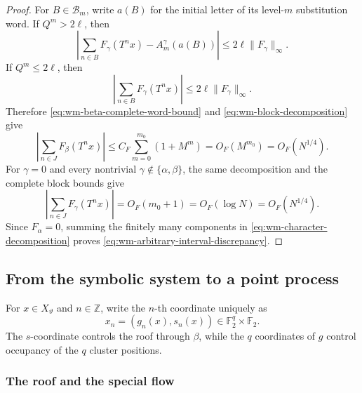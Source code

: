 \documentclass[11pt,reqno,a4paper]{amsart}
\numberwithin{equation}{section}
\theoremstyle{compact}
\theoremstyle{definition}
\theoremstyle{definition}
\begin{document}
\begin{proof}
For $B\in\mathcal B_m$, write $a(B)$ for the initial letter of its
level-$m$ substitution word.  If $Q^m>2\ell$, then
\begin{equation}\label{eq:wm-complete-block-vs-interior}
  \left|
    \sum_{n\in B}F_\gamma(T^nx)-A_m^\gamma(a(B))
  \right|
  \leq2\ell\|F_\gamma\|_\infty.
\end{equation}
If $Q^m\leq2\ell$, then
\[
  \left|\sum_{n\in B}F_\gamma(T^nx)\right|
  \leq2\ell\|F_\gamma\|_\infty.
\]
Therefore \eqref{eq:wm-beta-complete-word-bound} and
\eqref{eq:wm-block-decomposition} give
\begin{equation}\label{eq:wm-geometric-discrepancy-sum}
  \left|\sum_{n\in J}F_\beta(T^nx)\right|
  \leq C_F\sum_{m=0}^{m_0}(1+M^m)
  =O_F(M^{m_0})
  =O_F(N^{1/4}).
\end{equation}
For $\gamma=0$ and every nontrivial
$\gamma\notin\{\alpha,\beta\}$, the same decomposition and the complete
block bounds give
\[
  \left|\sum_{n\in J}F_\gamma(T^nx)\right|
  =O_F(m_0+1)=O_F(\log N)=O_F(N^{1/4}).
\]
Since $F_\alpha=0$, summing the finitely many components in
\eqref{eq:wm-character-decomposition} proves
\eqref{eq:wm-arbitrary-interval-discrepancy}.
\end{proof}


\subsection{From the symbolic system to a point process}
\label{subsec:wm-suspension}

For $x\in X_\vartheta$ and $n\in\mathbb Z$, write the $n$-th coordinate
uniquely as
\begin{equation}\label{eq:wm-coordinate-decomposition}
  x_n=(g_n(x),s_n(x))\in\mathbb F_2^q\times\mathbb F_2.
\end{equation}
The $s$-coordinate controls the roof through $\beta$, while the $q$
coordinates of $g$ control occupancy of the $q$ cluster positions.

\subsubsection{The roof and the special flow}
\end{document}
